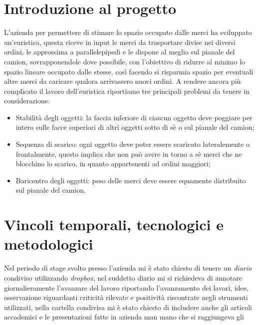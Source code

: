 \section{Introduzione al progetto}
L'azienda per permettere di stimare lo spazio occupato dalle merci ha sviluppato un'euristica, questa riceve in input le merci da trasportare divise nei diversi ordini, le approssima a parallelepipedi e le dispone al meglio sul pianale del camion, sovrapponendole dove possibile, con l'obiettivo di ridurre al minimo lo spazio lineare occupato dalle stesse, così facendo si risparmia spazio per eventuali altre merci da caricare qualora arrivassero nuovi ordini.
A rendere ancora più complicato il lavoro dell'euristica riportiamo tre principali problemi da tenere in considerazione:
\begin{itemize}
    \item Stabilità degli oggetti: la faccia inferiore di ciascun oggetto deve poggiare per intero sulle facce superiori di altri oggetti sotto di sè o sul pianale del camion;
    \item Sequenza di scarico: ogni oggetto deve poter essere scaricato lateralemente o frontalmente, questo implica che non può avere in torno a sè merci che ne blocchino lo scarico, in quanto appartenenti ad ordini maggiori;
    \item Baricentro degli oggetti: peso delle merci deve essere equamente distribuito sul pianale del camion.
\end{itemize}

\section{Vincoli temporali, tecnologici e metodologici}
Nel periodo di stage svolto presso l'azienda mi è stato chiesto di tenere un \textit{diario} condiviso utilizzando \textit{dropbox}, nel suddetto diario mi si richiedeva di annotare giornalieramente l'avanzare del lavoro riportando l'avanzamento dei lavori, idee, osservazione riguardanti criticità rilevate e positività riscontrate negli strumenti utilizzati, nella cartella condivisa mi è stato chiesto di includere anche gli articoli accademici e le presentazioni fatte in azienda man mano che si raggiungeva gli  